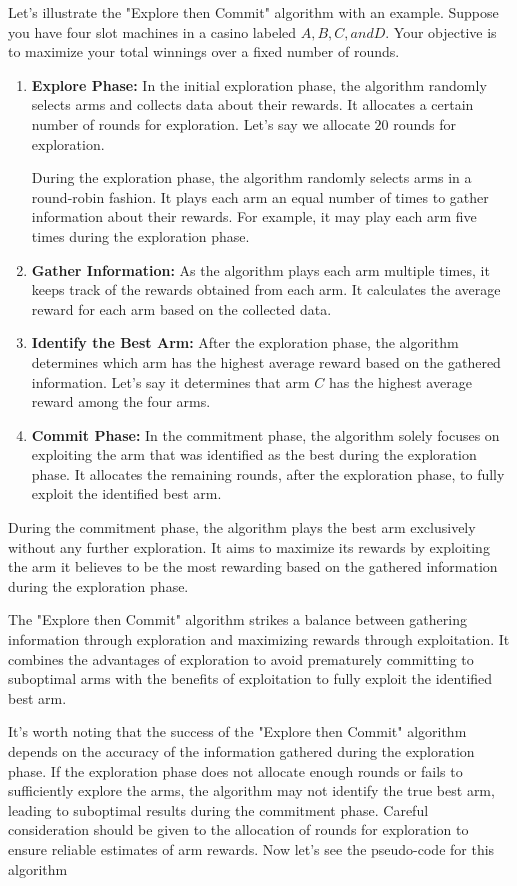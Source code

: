 \documentclass{article}
\begin{document}
Let's illustrate the "Explore then Commit" algorithm with an example. Suppose you have four slot machines in a casino labeled $A, B, C, and D$. Your objective is to maximize your total winnings over a fixed number of rounds.
\begin{enumerate}
\item \textbf{Explore Phase:}
In the initial exploration phase, the algorithm randomly selects arms and collects data about their rewards. It allocates a certain number of rounds for exploration. Let's say we allocate $20$ rounds for exploration.

During the exploration phase, the algorithm randomly selects arms in a round-robin fashion. It plays each arm an equal number of times to gather information about their rewards. For example, it may play each arm five times during the exploration phase.

\item \textbf{Gather Information:}
As the algorithm plays each arm multiple times, it keeps track of the rewards obtained from each arm. It calculates the average reward for each arm based on the collected data.

\item \textbf{Identify the Best Arm:}
After the exploration phase, the algorithm determines which arm has the highest average reward based on the gathered information. Let's say it determines that arm $C$ has the highest average reward among the four arms.

\item \textbf{Commit Phase:}
In the commitment phase, the algorithm solely focuses on exploiting the arm that was identified as the best during the exploration phase. It allocates the remaining rounds, after the exploration phase, to fully exploit the identified best arm.
\end{enumerate}
During the commitment phase, the algorithm plays the best arm exclusively without any further exploration. It aims to maximize its rewards by exploiting the arm it believes to be the most rewarding based on the gathered information during the exploration phase.

The "Explore then Commit" algorithm strikes a balance between gathering information through exploration and maximizing rewards through exploitation. It combines the advantages of exploration to avoid prematurely committing to suboptimal arms with the benefits of exploitation to fully exploit the identified best arm.

It's worth noting that the success of the "Explore then Commit" algorithm depends on the accuracy of the information gathered during the exploration phase. If the exploration phase does not allocate enough rounds or fails to sufficiently explore the arms, the algorithm may not identify the true best arm, leading to suboptimal results during the commitment phase. Careful consideration should be given to the allocation of rounds for exploration to ensure reliable estimates of arm rewards.
Now let's see the pseudo-code for this algorithm
\end{document}
